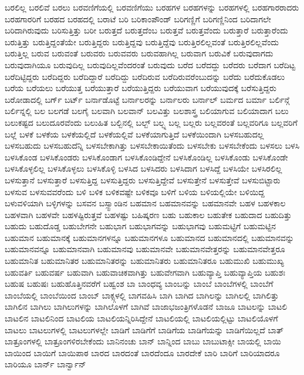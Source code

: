 {ಬರಲಿಲ್ಲ
ಬರಲಿವೆ
ಬರಲು
ಬರವಣಿಗೆಯಲ್ಲಿ
ಬರವಣಿಗೆಯು
ಬರಹಗಳ
ಬರಹಗಳನ್ನು
ಬರಹಗಳಲ್ಲಿ
ಬರಹಗಾರರಾದರು
ಬರಹಗಾರರಿಗೆ
ಬರಹದ
ಬರಹದಲ್ಲಿ
ಬರಾಟೆ
ಬರಿ
ಬರಿಕಾಂಪೌಂಡ್
ಬರಿಗಣ್ಣಿಗೆ
ಬರಿಗಣ್ಣಿನಿಂದ
ಬರಿದಾಗಲೇ
ಬರಿದಾಗಿರುವುದು
ಬರಿಸುತ್ತಿತ್ತು
ಬರೀ
ಬರುತ್ತದೆ
ಬರುತ್ತದೆಂಬ
ಬರುತ್ತವೆ
ಬರುತ್ತವೆಂದು
ಬರುತ್ತಾರೆ
ಬರುತ್ತಾರೆಂದು
ಬರುತ್ತಿತ್ತು
ಬರುತ್ತಿದ್ದಂತೆಯೇ
ಬರುತ್ತಿದ್ದರು
ಬರುತ್ತಿದ್ದವು
ಬರುತ್ತಿದ್ದೆವು
ಬರುತ್ತಿರಲಿಲ್ಲವಂತೆ
ಬರುತ್ತಿರಲಿಲ್ಲವೆಂದು
ಬರುತ್ತಿಲ್ಲ
ಬರುವ
ಬರುವಂತೆ
ಬರುವರು
ಬರುವವರು
ಬರುವಹಾಗಿಲ್ಲ
ಬರುವಾಗ
ಬರುವಿಕೆ
ಬರುವುದಾಗದು
ಬರುವುದಾಗಿಯೂ
ಬರುವುದಿಲ್ಲ
ಬರುವುದಿಲ್ಲವೆಂದರಂತೆ
ಬರುವುದು
ಬರೆದ
ಬರೆದದ್ದು
ಬರೆದರು
ಬರೆದಾಗ
ಬರೆದಿಟ್ಟ
ಬರೆದಿಟ್ಟಿದ್ದರು
ಬರೆದಿದ್ದರು
ಬರೆದಿದ್ದಾರೆ
ಬರೆದಿದ್ದು
ಬರೆದಿರುವ
ಬರೆದಿರುವರೆಂಬುದನ್ನು
ಬರೆದು
ಬರೆದುಕೊಡಲು
ಬರೆಯ
ಬರೆಯಲು
ಬರೆಯುತ್ತ
ಬರೆಯುತ್ತಾರೆ
ಬರೆಯುತ್ತಿದ್ದರು
ಬರೆಯುವಾಗ
ಬರೆಯುವುದಕ್ಕೆ
ಬರೆಸುತ್ತಿದ್ದರು
ಬರೋಡಾದಲ್ಲಿ
ಬರ್ಗ್
ಬರ್ಟ್
ಬರ್ನಾಡೊಟ್ಟೆ
ಬರ್ನಾಲರನ್ನು
ಬರ್ನಾಲರು
ಬರ್ನಾಲ್
ಬರ್ಮದ
ಬರ್ಮಾ
ಬರ್ಲಿನ್ಗೆ
ಬರ್ಲಿನ್ನಲ್ಲಿ
ಬಲ
ಬಲಗಡೆ
ಬಲಗೈ
ಬಲವಾಗಿ
ಬಲವಾನ್
ಬಲವಿತ್ತು
ಬಲಶಾಸ್ತ್ರ
ಬಲಿಯಾಗುವ
ಬಲಿಯಾದಾಗ
ಬಲು
ಬಲುಕಷ್ಟದ
ಬಲುದೂರವೆಂದು
ಬಲುಹಿತ
ಬಲ್ಬಿನಲ್ಲಿ
ಬಲ್ಬ್
ಬಲ್ಬ್ನ
ಬಲ್ಲ
ಬಲ್ಲರು
ಬಲ್ಲವರಂತೆ
ಬಲ್ಲವರಿಗೂ
ಬಲ್ಲವರಿಗೆ
ಬಲ್ಲೆ
ಬಳಕೆ
ಬಳಕೆಯ
ಬಳಕೆಯಲ್ಲಿದೆ
ಬಳಕೆಯಲ್ಲಿವೆ
ಬಳಕೆಯಾಗುತ್ತಿದೆ
ಬಳಕೆಯಿಂದಾಗಿ
ಬಳಸಬಹುದಲ್ಲ
ಬಳಸಬಹುದು
ಬಳಸಬಹುದೆನ್ನಿ
ಬಳಸಬೇಕಾಗಿತ್ತು
ಬಳಸಬೇಕಾಯಿತೆಂದು
ಬಳಸಬೇಕು
ಬಳಸಬೇಕೆಂದು
ಬಳಸಲು
ಬಳಸಿ
ಬಳಸಿಕೊಂಡ
ಬಳಸಿಕೊಂಡರು
ಬಳಸಿಕೊಂಡಾಗ
ಬಳಸಿಕೊಂಡಿದ್ದೇನೆ
ಬಳಸಿಕೊಂಡಿಲ್ಲ
ಬಳಸಿಕೊಂಡು
ಬಳಸಿಕೊಂಡೇ
ಬಳಸಿಕೊಳ್ಳಲಿಲ್ಲ
ಬಳಸಿಕೊಳ್ಳಲು
ಬಳಸಿಕೊಳ್ಳಿ
ಬಳಸಿದ
ಬಳಸಿದರು
ಬಳಸಿದಾಗ
ಬಳಸಿದ್ದೆ
ಬಳಸಿಯೇ
ಬಳಸಿರಲಿಲ್ಲ
ಬಳಸುತ್ತಾನೆ
ಬಳಸುತ್ತಾರೆ
ಬಳಸುತ್ತಿದ್ದ
ಬಳಸುತ್ತಿದ್ದರು
ಬಳಸುತ್ತಿದ್ದೇವೆ
ಬಳಸುತ್ತೇನೆ
ಬಳಸುತ್ತೇವೆ
ಬಳಸುಬಿಟ್ಟಾರು
ಬಳಸುವ
ಬಳಸುವವರೆಂದು
ಬಳಿ
ಬಳಿಕ
ಬಳಿಕವಷ್ಟೇ
ಬಳಿಕವೂ
ಬಳಿಗೆ
ಬಳಿಯ
ಬಳಿಯಲ್ಲಿಯೇ
ಬಳಿಯಿದ್ದ
ಬಳುವಳಿಯಾಗಿ
ಬಳ್ಳಿಗಳನ್ನು
ಬಸವನ
ಬಸ್ಸ್ಟಾಂಡಿನ
ಬಹಮಾನ
ಬಹಮಾನವನ್ನು
ಬಹಮಾನವೇ
ಬಹಳ
ಬಹಳಕಾಲ
ಬಹಳವಾಗಿ
ಬಹಳವೇ
ಬಹಳಷ್ಟಿರುತ್ತವೆ
ಬಹಳಷ್ಟು
ಬಹಿಷ್ಕರಣ
ಬಹು
ಬಹುಕಾಲ
ಬಹುತೇಕ
ಬಹುದಾದ
ಬಹುದಿತ್ತು
ಬಹುದು
ಬಹುದೊಡ್ಡ
ಬಹುಬೇಗನೇ
ಬಹುಭಾಗ
ಬಹುಭಾಗವನ್ನು
ಬಹುಭಾಗವು
ಬಹುಮಟ್ಟಿಗೆ
ಬಹುಮಟ್ಟಿನ
ಬಹುಮಾನ
ಬಹುಮಾನಕ್ಕೆ
ಬಹುಮಾನಗಳನ್ನೂ
ಬಹುಮಾನಗಳೂ
ಬಹುಮಾನದ
ಬಹುಮಾನದಲ್ಲಿ
ಬಹುಮಾನವನ್ನು
ಬಹುಮಾನವನ್ನೂ
ಬಹುಮಾನವಾಗಿ
ಬಹುಮಾನವು
ಬಹುಮಾನವೇ
ಬಹುಮಾನವೇತ್ತರನ್ನು
ಬಹುಮಾನವೇತ್ತರೂ
ಬಹುಮಾನಿತ
ಬಹುಮಾನಿತರ
ಬಹುಮಾನಿತರನ್ನು
ಬಹುಮಾನಿತರು
ಬಹುಮಾನಿತರೂ
ಬಹುಮುಖಿ
ಬಹುಮುಖ್ಯ
ಬಹುವರ್ತಿ
ಬಹುವರ್ಷ
ಬಹುವಾಗಿ
ಬಹುವಾಚಿಕವಾಗಿತ್ತು
ಬಹುವೇಗವಾಗಿ
ಬಹುವ್ಯಾಪ್ತಿ
ಬಹುವ್ಯಾಪ್ತಿಯ
ಬಹುಶಃ
ಬಹುಷ
ಬಹುಷಃ
ಬಹುಹೊತ್ತಿನವರೆಗೆ
ಬಹ್ವಂಶ
ಬಾ
ಬಾಂಧವ್ಯ
ಬಾಂಬನ್ನು
ಬಾಂಬೆ
ಬಾಂಬೆಗಳಲ್ಲಿ
ಬಾಂಬೆಗೆ
ಬಾಂಬೆಯಲ್ಲಿ
ಬಾಂಬೆಯಿಂದ
ಬಾಂಬ್
ಬಾಕ್ಸ್ಗಳಲ್ಲಿ
ಬಾಗವಹಿಸಿ
ಬಾಗಿ
ಬಾಗಿದ
ಬಾಗಿಲನ್ನು
ಬಾಗಿಲಲ್ಲಿ
ಬಾಗಿಲಿತ್ತು
ಬಾಗಿಲಿನ
ಬಾಗಿಲು
ಬಾಗಿಲುಗಳನ್ನು
ಬಾಗಿಲೊಳಗೆ
ಬಾಗಿವೆ
ಬಾಜಾಭಜಂತ್ರಿಗಳೊಡನೆ
ಬಾಜೂ
ಬಾಟಲನ್ನು
ಬಾಟಲಿ
ಬಾಟಲಿನ
ಬಾಟಲಿನಿಂದ
ಬಾಟಲಿಯ
ಬಾಟಲಿಯನ್ನಿರಿಸಿದ್ದೇನೆ
ಬಾಟಲಿಯಲ್ಲಿ
ಬಾಟಲಿಯಲ್ಲಿಟ್ಟು
ಬಾಟಲಿಯೊಳಗೆ
ಬಾಟಲು
ಬಾಟಲುಗಳಲ್ಲಿ
ಬಾಟಲುಗಳಲ್ಲೇ
ಬಾಡಿಗೆ
ಬಾಡಿಗೆಗೆ
ಬಾಡಿಗೆಯ
ಬಾಡಿಗೆಯನ್ನು
ಬಾಡಿಗೆಯಿಲ್ಲದೆ
ಬಾತ್
ಬಾತ್ರೂಂಗಳಲ್ಲಿ
ಬಾತ್ರೂಂಗಳಿರಬೇಕೆಂದು
ಬಾನಿನಂಚು
ಬಾನ್
ಬಾನ್ನಿಂದ
ಬಾಬು
ಬಾಬುಟಾಕ್ಸೀ
ಬಾಯಲ್ಲಿ
ಬಾಯಿ
ಬಾಯಿಂದ
ಬಾಯಿಗೆ
ಬಾಯಿಪಾಠ
ಬಾರದ
ಬಾರದಂತೆ
ಬಾರದೆಂದೂ
ಬಾರದೇಕೆ
ಬಾರಿ
ಬಾರಿಗೆ
ಬಾರಿಯಾದರೂ
ಬಾರಿಯೂ
ಬಾರ್ನ್
ಬಾರ್ನ್ವಾನ್
}
